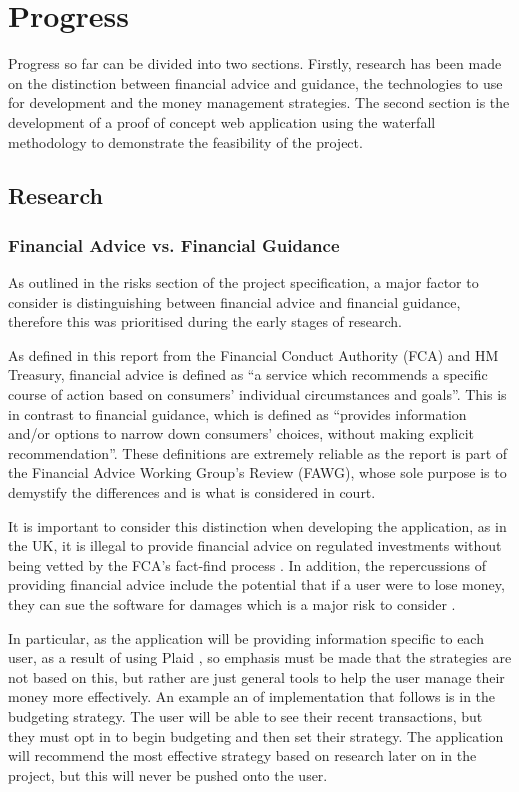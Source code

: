 \section{Progress} \label{sec:progress}
Progress so far can be divided into two sections. Firstly, research has been made on the distinction between financial advice and guidance, the technologies to use for development and the money management strategies. The second section is the development of a proof of concept web application using the waterfall methodology to demonstrate the feasibility of the project.

\subsection{Research}
\subsubsection{Financial Advice vs. Financial Guidance}
As outlined in the risks section of the project specification, a major factor to consider is distinguishing between financial advice and financial guidance, therefore this was prioritised during the early stages of research.

As defined in this report \cite{FCAReport} from the Financial Conduct Authority (FCA) and HM Treasury, financial advice is defined as ``a service which recommends a specific course of action based on consumers' individual circumstances and goals''. This is in contrast to financial guidance, which is defined as ``provides information and/or options to narrow down consumers' choices, without making explicit recommendation''. These definitions are extremely reliable as the report is part of the Financial Advice Working Group's Review (FAWG), whose sole purpose is to demystify the differences and is what is considered in court.

It is important to consider this distinction when developing the application, as in the UK, it is illegal to provide financial advice on regulated investments without being vetted by the FCA's fact-find process \cite{FinancialAdviceLegalities}. In addition, the repercussions of providing financial advice include the potential that if a user were to lose money, they can sue the software for damages which is a major risk to consider \cite{SueBroker}. 

In particular, as the application will be providing information specific to each user, as a result of using Plaid \cite{Plaid}, so emphasis must be made that the strategies are not based on this, but rather are just general tools to help the user manage their money more effectively. An example an of implementation that follows is in the budgeting strategy. The user will be able to see their recent transactions, but they must opt in to begin budgeting and then set their strategy. The application will recommend the most effective strategy based on research later on in the project, but this will never be pushed onto the user.


